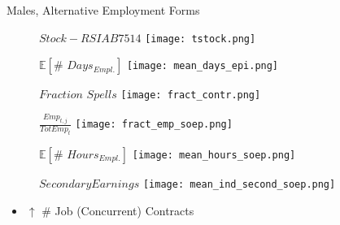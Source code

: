 \documentclass{beamer}
\begin{document}
\begin{frame}{Males, Alternative Employment Forms}
\begin{figure}[!t]
\centering
\begin{minipage}[b]{0.3\textwidth}{$Stock - RSIAB7514$}
\centering
\texttt{[image: tstock.png]}
\end{minipage}
\begin{minipage}[b]{0.3\textwidth}{$\mathbb{E}[\# \,\, Days_{Empl.}]$}
\centering
\texttt{[image: mean\_days\_epi.png]}
\end{minipage}
\begin{minipage}[b]{0.3\textwidth}{$Fraction \,\, Spells$}
\centering
\texttt{[image: fract\_contr.png]}
\end{minipage}
\end{figure}
\begin{figure}[!t]
\centering
\begin{minipage}[b]{0.3\textwidth}{$\frac{Emp_{t,j}}{TotEmp_{t}}$}
\centering
\texttt{[image: fract\_emp\_soep.png]}
\end{minipage}
\begin{minipage}[b]{0.3\textwidth}{$\mathbb{E}[\# \,\, Hours_{Empl.}]$}
\centering
\texttt{[image: mean\_hours\_soep.png]}
\end{minipage}
\begin{minipage}[b]{0.3\textwidth}{$Secondary Earnings$}
\centering
\texttt{[image: mean\_ind\_second\_soep.png]}
\end{minipage}
\end{figure}
\begin{itemize}
\setlength{\itemsep}{0.7 cm}
\item $\uparrow$ \# Job (Concurrent) Contracts
\end{itemize}
\end{frame}
\end{document}
